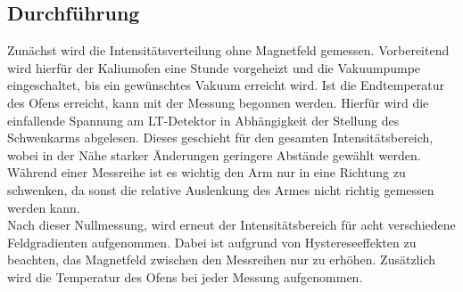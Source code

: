 \subsection{Durchführung}
\label{sec:durchführung}
Zunächst wird die Intensitätsverteilung ohne Magnetfeld gemessen.
Vorbereitend wird hierfür der Kaliumofen eine Stunde vorgeheizt und die Vakuumpumpe eingeschaltet, bis ein gewünschtes Vakuum erreicht wird.
Ist die Endtemperatur des Ofens erreicht, kann mit der Messung begonnen werden.
Hierfür wird die einfallende Spannung am LT-Detektor in Abhängigkeit der Stellung des Schwenkarms abgelesen.
Dieses geschieht für den gesamten Intensitätsbereich, wobei in der Nähe starker Änderungen geringere Abstände gewählt werden.
Während einer Messreihe ist es wichtig den Arm nur in eine Richtung zu schwenken, da sonst die relative Auslenkung des Armes nicht richtig gemessen werden kann.\\
Nach dieser Nullmessung, wird erneut der Intensitätsbereich für acht verschiedene Feldgradienten aufgenommen.
Dabei ist aufgrund von Hystereseeffekten zu beachten, das Magnetfeld zwischen den Messreihen nur zu erhöhen.
Zusätzlich wird die Temperatur des Ofens bei jeder Messung aufgenommen.
